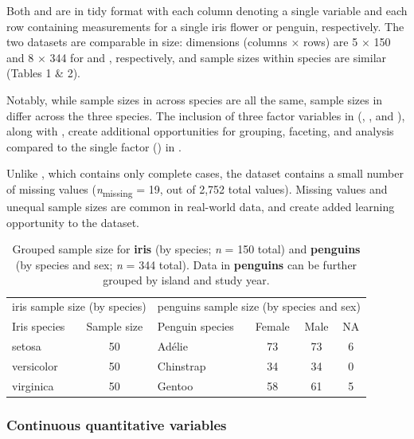 Both  and  are in tidy format
\citep{wickham_tidy_2014} with each column denoting a single variable
and each row containing measurements for a single iris flower or
penguin, respectively. The two datasets are comparable in size:
dimensions (columns × rows) are 5 × 150 and 8 × 344 for  and
, respectively, and sample sizes within species are
similar (Tables 1 \& 2).

Notably, while sample sizes in  across species are all the
same, sample sizes in  differ across the three species.
The inclusion of three factor variables in 
(, , and ), along with ,
create additional opportunities for grouping, faceting, and analysis
compared to the single factor () in .

Unlike , which contains only complete cases, the
 dataset contains a small number of missing values
(\emph{n}\textsubscript{missing} = 19, out of 2,752 total values).
Missing values and unequal sample sizes are common in real-world data,
and create added learning opportunity to the  dataset.

\begin{Schunk}
\begin{table}

\caption{\label{tab:unnamed-chunk-4}Grouped sample size for \textbf{iris} (by species; \textit{n} = 150 total) and \textbf{penguins} (by species and sex; \textit{n} = 344 total). Data in \textbf{penguins} can be further grouped by island and study year.}
\centering
\begin{tabular}[t]{lclccc}
\toprule
\multicolumn{2}{c}{iris sample size (by species)} & \multicolumn{4}{c}{penguins sample size (by species and sex)} \\
\cmidrule(l{3pt}r{3pt}){1-2} \cmidrule(l{3pt}r{3pt}){3-6}
Iris species & Sample size & Penguin species & Female & Male & NA\\
\midrule
setosa & 50 & Adélie & 73 & 73 & 6\\
versicolor & 50 & Chinstrap & 34 & 34 & 0\\
virginica & 50 & Gentoo & 58 & 61 & 5\\
\bottomrule
\end{tabular}
\end{table}

\end{Schunk}

\hypertarget{continuous-quantitative-variables}{%
\subsubsection{Continuous quantitative
variables}\label{continuous-quantitative-variables}}

